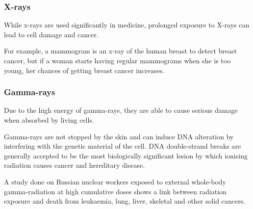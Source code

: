             \subsubsection{ X-rays}
            \nopagebreak
        \label{m38779*id189613}While x-rays are used significantly in medicine, prolonged exposure to X-rays can lead to cell damage and cancer.\par 
        \label{m38779*id189617}For example, a mammogram is an x-ray of the human breast to detect breast cancer, but if a woman starts having regular mammograms when she is too young, her chances of getting breast cancer increases.\par 
      \label{m38779*uid23}
            \subsubsection{ Gamma-rays}
            \nopagebreak
        \label{m38779*id189632}Due to the high energy of gamma-rays, they are able to cause serious damage when absorbed by living cells.\par 
        \label{m38779*id189636}Gamma-rays are not stopped by the skin and can induce DNA alteration by interfering with the genetic material of the cell. DNA double-strand breaks are generally accepted to be the most biologically significant lesion by which ionising radiation causes cancer and hereditary disease.\par 
        \label{m38779*id189642}A study done on Russian nuclear workers exposed to external whole-body gamma-radiation at high cumulative doses shows a link between radiation exposure and death from leukaemia, lung, liver, skeletal and other solid cancers.\par 
      \label{m38779*eip-665}
